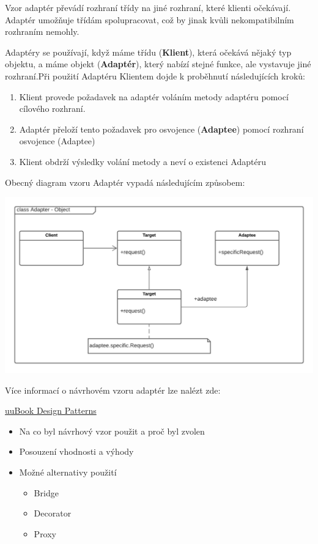 \documentclass{homework}
\begin{document}
Vzor adaptér převádí rozhraní třídy na jiné rozhraní, které klienti očekávají. Adaptér umožňuje třídám spolupracovat, což by jinak kvůli nekompatibilním rozhraním nemohly.

Adaptéry se používají, když máme třídu (\textbf{Klient}), která očekává nějaký typ objektu, a máme objekt (\textbf{Adaptér}), který nabízí stejné funkce, ale vystavuje jiné rozhraní.Při použití Adaptéru Klientem dojde k proběhnutí následujících kroků:

\begin{enumerate}
  \item Klient provede požadavek na adaptér voláním metody adaptéru pomocí cílového rozhraní.
  \item Adaptér přeloží tento požadavek pro osvojence (\textbf{Adaptee}) pomocí rozhraní osvojence (Adaptee)
  \item Klient obdrží výsledky volání metody a neví o existenci Adaptéru
\end{enumerate}

Obecný diagram vzoru Adaptér vypadá následujícím způsobem:

\begin{center}
\includegraphics[scale=0.75]{Adapter.png}
\end{center}

Více informací o návrhovém vzoru adaptér lze nalézt zde:

\href{https://uuapp.plus4u.net/uu-bookkit-maing01/f0b1d8809f3a436fb5413d9ea3226277/book/page?code=38722233}{uuBook Design Patterns}


\begin{itemize}

  \item Na co byl návrhový vzor použit a proč byl zvolen
  \item Posouzení vhodnosti a výhody
  \item Možné alternativy použití
  
  \begin{itemize}
  
  \item Bridge
  \item Decorator
  \item Proxy
  
  \end{itemize}
  
\end{itemize}
\end{document}
